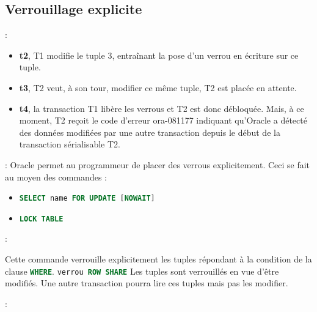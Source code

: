 \documentclass[10pt]{beamer}
\begin{document}
\subsection{Verrouillage explicite}
\begin{frame}{\secname : \subsecname}
    \begin{itemize}
        \item \textbf{t2}, T1 modifie le tuple 3, entraînant la pose d'un verrou en écriture sur ce tuple.
        \item \textbf{t3}, T2 veut, à son tour, modifier ce même tuple, T2 est placée en attente.
        \item \textbf{t4}, la transaction T1 libère les verrous et T2 est donc débloquée. Mais, à ce moment, T2 reçoit le code d'erreur ora-081177 indiquant qu'Oracle a détecté des données modifiées par une autre transaction depuis le début de la transaction sérialisable T2.
    \end{itemize}
\end{frame}

\begin{frame}{\secname : \subsecname}
    Oracle permet au programmeur de placer des verrous explicitement. Ceci se fait au moyen des commandes :
    \begin{itemize}
        \item \lstinline[language=sql]!SELECT name FOR UPDATE [NOWAIT]!
        \item \lstinline[language=sql]!LOCK TABLE!
    \end{itemize}
\end{frame}

\begin{frame}{\secname : \subsecname}
    
    Cette commande verrouille explicitement les tuples répondant à la condition de la clause \lstinline[language=sql]!WHERE!.
    \lstinline[language=sql]!verrou ROW SHARE!
    Les tuples sont verrouillés en vue d'être modifiés.  Une autre transaction pourra lire ces tuples mais pas les modifier.
\end{frame}

\begin{frame}{\secname : \subsecname}
    
\end{frame}
\end{document}
